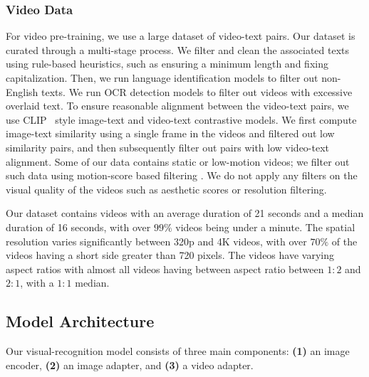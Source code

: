 \documentclass[dvipsnames]{fairmeta}
\begin{document}
\subsubsection{Video Data}
\label{subsubsection:vision_data_video}
For video pre-training, we use a large dataset of video-text pairs.
Our dataset is curated through a multi-stage process.
We filter and clean the associated texts using rule-based heuristics, such as ensuring a minimum length and fixing capitalization.
Then, we run language identification models to filter out non-English texts.
We run OCR detection models to filter out videos with excessive overlaid text.
To ensure reasonable alignment between the video-text pairs,
we use CLIP~\citep{radford2021learning} style image-text and video-text contrastive models. We first compute image-text similarity using a single frame in the videos and filtered out low similarity pairs, and then subsequently filter out pairs with low video-text alignment.
Some of our data contains static or low-motion videos; we filter out such data using motion-score based filtering \citep{girdhar2023emu}.
We do not apply any filters on the visual quality of the videos such as aesthetic scores or resolution filtering.

Our dataset contains videos with an average duration of 21 seconds and a median duration of 16 seconds, with over $99\%$ videos being under a minute.
The spatial resolution varies significantly between 320p and 4K videos, with over $70\%$ of the videos having a short side greater than 720 pixels.
The videos have varying aspect ratios with almost all videos having between aspect ratio between $1{:}2$ and $2{:}1$, with a $1{:}1$ median.

\subsection{Model Architecture}
\label{section:vision_model_architecture}
Our visual-recognition model consists of three main components: \textbf{(1)} an image encoder, \textbf{(2)} an image adapter, and \textbf{(3)} a video adapter.
\end{document}
